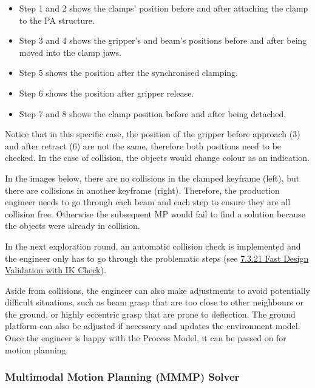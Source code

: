 \begin{itemize}
	\item Step 1 and 2 shows the clamps’ position before and after attaching the clamp to the PA structure. 

	\item Step 3 and 4 shows the gripper’s and beam’s positions before and after being moved into the clamp jaws. 

	\item Step 5 shows the position after the synchronised clamping.

	\item Step 6 shows the position after gripper release. 

	\item Step 7 and 8 shows the clamp position before and after being detached.

\end{itemize}
Notice that in this specific case, the position of the gripper before approach (3) and after retract (6) are not the same, therefore both positions need to be checked. In the case of collision, the objects would change colour as an indication.



In the images below, there are no collisions in the clamped keyframe (left), but there are collisions in another keyframe (right). Therefore, the production engineer needs to go through each beam and each step to ensure they are all collision free. Otherwise the subsequent MP would fail to find a solution because the objects were already in collision. 



In the next exploration round, an automatic collision check is implemented and the engineer only has to go through the problematic steps (see \ul{7.3.21 Fast Design Validation with IK Check}).

Aside from collisions, the engineer can also make adjustments to avoid potentially difficult situations, such as beam grasp that are too close to other neighbours or the ground, or highly eccentric grasp that are prone to deflection. The ground platform can also be adjusted if necessary and updates the environment model. Once the engineer is happy with the Process Model, it can be passed on for motion planning. 

\subsubsection{Multimodal Motion Planning (MMMP) Solver}
\label{subsubsection:exploration_3_multimodal_motion_planning_mmmp_solver}

